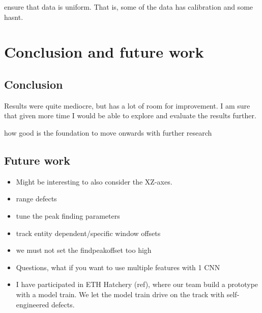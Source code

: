ensure that data is uniform. That is, some of the data has calibration and some hasnt. 





\chapter{Conclusion and future work}

\section{Conclusion}
Results were quite mediocre, but has a lot of room for improvement. I am sure that given more time I would be able to explore and evaluate the results further.

how good is the foundation to move onwards with further research
\section{Future work}

\begin{itemize}
	\item Might be interesting to also consider the XZ-axes.
	\item range defects
	\item tune the peak finding parameters
	\item track entity dependent/specific window offsets
	\item we must not set the findpeakoffset too high
	\item Questions, what if you want to use multiple features with 1 CNN
	\item I have participated in ETH Hatchery (ref), where our team build a prototype with a model train. We let the model train drive on the track with self-engineered defects.

\end{itemize}

\newpage
